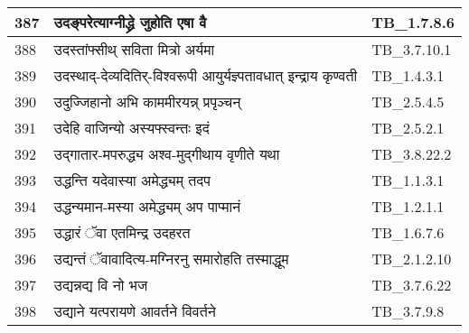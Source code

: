 \documentclass[17pt]{extarticle}
\begin{document}
\begin{longtable}{||p{0.4in}||p{4.9in}||p{0.9in}||}
    \hline
        
    387 & उदङ्परेत्याग्नीद्ध्रे जुहोति एषा वै & TB\_1.7.8.6       \\
    
    \hline
        
    388 & उदस्तांफ्सीथ् सविता मित्रो अर्यमा & TB\_3.7.10.1       \\
    
    \hline
        
    389 & उदस्थाद्{-}देव्यदितिर्{-}विश्वरूपी आयुर्यज्ञ्पतावधात् इन्द्राय कृण्वती & TB\_1.4.3.1       \\
    
    \hline
        
    390 & उदुज्जिहानो अभि काममीरयन्न् प्रपृञ्चन् & TB\_2.5.4.5       \\
    
    \hline
        
    391 & उदेहि वाजिन्यो अस्यफ्स्वन्तः इदं & TB\_2.5.2.1       \\
    
    \hline
        
    392 & उद्गातार{-}मपरुद्ध्य अश्व{-}मुद्गीथाय वृणीते यथा & TB\_3.8.22.2       \\
    
    \hline
        
    393 & उद्धन्ति यदेवास्या अमेद्ध्यम् तदप & TB\_1.1.3.1       \\
    
    \hline
        
    394 & उद्धन्यमान{-}मस्या अमेद्ध्यम् अप पाप्मानं & TB\_1.2.1.1       \\
    
    \hline
        
    395 & उद्धारं ॅवा एतमिन्द्र उदहरत & TB\_1.6.7.6       \\
    
    \hline
        
    396 & उद्यन्तं ॅवावादित्य{-}मग्निरनु समारोहति तस्माद्धूम & TB\_2.1.2.10       \\
    
    \hline
        
    397 & उद्यन्नद्य वि नो भज & TB\_3.7.6.22       \\
    
    \hline
        
    398 & उद्याने यत्परायणे आवर्तने विवर्तने & TB\_3.7.9.8       \\
    

\end{longtable}
\end{document}
